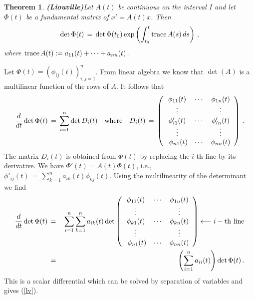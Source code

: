 \documentclass[12pt]{report}
\newtheorem{theorem}{Theorem}[section]
\newcommand{\proof}{\noindent {\em Proof:~}}
\newcommand{\nn}{\nonumber}
\def\eqref#1{(\ref{#1})}
\def\qed{\hbox{\hskip 6pt\vrule width6pt height7pt depth1pt
    \hskip1pt}\bigskip}
\begin{document}
\begin{theorem}{\bf (Liouville)}\label{liouville} Let $A(t)$ be continuous on 
the interval 
$I$ and  let $\Phi(t)$ be a fundamental matrix of $x'=A(t)x$. Then
\begin{equation} \label{lv}
\det \Phi(t) \,=\, \det \Phi(t_0) \exp\left( \int_{t_0}^t {\rm
  trace}\,A(s) \,ds\right) \,,  
\end{equation} 
where ${\rm trace}\, A(t) := a_{11}(t) + \cdots + a_{nn}(t)$. 
\end{theorem}

\proof Let $\Phi(t)= (\phi_{ij}(t))_{i,j=1}^n$. From linear algebra we
know that $\det(A)$ is a multilinear function of the rows of $A$. It
follows that
\begin{equation}
\frac{d}{dt}\det  \Phi(t) \,=\, \sum_{i=1}^n \det D_i(t) \quad {\rm where} 
\quad
D_i(t)\,=\, \left( \begin{array}{ccc}  \phi_{11}(t) & \cdots & \phi_{1n}(t) \\
\vdots && \vdots \\  \phi'_{i1}(t) & \cdots & \phi'_{in}(t) \\
\vdots && \vdots \\\ \phi_{n1}(t) & \cdots & \phi_{nn}(t)
\end{array} \right) \,.
\end{equation}
The matrix $D_i(t)$ is obtained from $\Phi(t)$ by replacing the $i$-th
line by its derivative. We have $\Phi'(t) =A(t) \Phi(t)$, i.e.,
$\phi'_{ij}(t)\,=\, \sum_{k=1}^n a_{ik}(t)\phi_{kj}(t)$. Using the
multilinearity of the determinant we find
\begin{eqnarray}\label{se}
\frac{d}{dt}\det \Phi(t) \,&=&\, \sum_{i=1}^n \sum_{k=1}^n a_{ik}(t) \det 
\left( \begin{array}{ccc}  \phi_{11}(t) & \cdots & \phi_{1n}(t) \\
\vdots && \vdots \\  \phi_{k1}(t) & \cdots & \phi_{kn}(t) \\
\vdots && \vdots \\\ \phi_{n1}(t) & \cdots & \phi_{nn}(t) \end{array} \right) 
\longleftarrow  i-{\rm th~line} \nn \\
\,&=&\, \left(\sum_{i=1}^n a_{ii}(t)\right) \det \Phi(t) \,.   
\end{eqnarray}
This is a scalar differential which can be solved by separation of variables 
and gives  \eqref{lv}.   \hfill \qed
\end{document}
